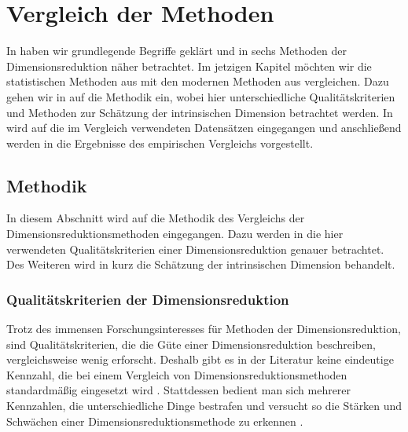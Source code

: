 \chapter{Vergleich der Methoden}
\label{ch:Vergleich}

In  haben wir grundlegende Begriffe geklärt und in
 sechs Methoden der Dimensionsreduktion näher betrachtet. Im jetzigen
Kapitel möchten wir die statistischen Methoden aus  mit
den modernen Methoden aus  vergleichen. Dazu gehen wir in
 auf die Methodik ein, wobei hier unterschiedliche
Qualitätskriterien und Methoden zur Schätzung der intrinsischen Dimension betrachtet werden. In
 wird auf die im Vergleich verwendeten Datensätzen
eingegangen und anschließend werden in  die Ergebnisse des
empirischen Vergleichs vorgestellt.

\section{Methodik}
\label{ch:Vergleich:sec:Methodik}

In diesem Abschnitt wird auf die Methodik des Vergleichs der Dimensionsreduktionsmethoden
eingegangen. Dazu werden in  die
hier verwendeten Qualitätskriterien einer Dimensionsreduktion genauer betrachtet. Des Weiteren wird
in  kurz die Schätzung der
intrinsischen Dimension behandelt. 
\subsection{Qualitätskriterien der Dimensionsreduktion}
\label{ch:Vergleich:sec:Methodik:subsec:Qualitaetskriterien}
Trotz des immensen Forschungsinteresses für Methoden der Dimensionsreduktion, sind Qualitätskriterien, die die Güte einer Dimensionsreduktion beschreiben, vergleichsweise wenig erforscht. Deshalb gibt es in der Literatur keine eindeutige Kennzahl, die bei einem Vergleich von Dimensionsreduktionsmethoden standardmäßig eingesetzt wird \parencite[vgl.][1 -- 2]{Lee.2009}. Stattdessen bedient man sich mehrerer Kennzahlen, die
unterschiedliche Dinge bestrafen und versucht so die Stärken und Schwächen einer
Dimensionsreduktionsmethode zu erkennen \parencite[486]{Venna.2001}.

